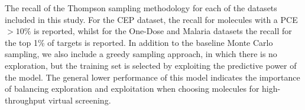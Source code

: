 The recall of the Thompson sampling methodology for each of the datasets included in this study.  For the CEP dataset, the recall for molecules with a PCE $>10\%$ is reported, whilst for the One-Dose and Malaria datasets the recall for the top 1\% of targets is reported.  In addition to the baseline Monte Carlo sampling, we also include a greedy sampling approach, in which there is no exploration, but the training set is selected by exploiting the predictive power of the model.  The general lower performance of this model indicates the importance of balancing exploration and exploitation when choosing molecules for high-throughput virtual screening.